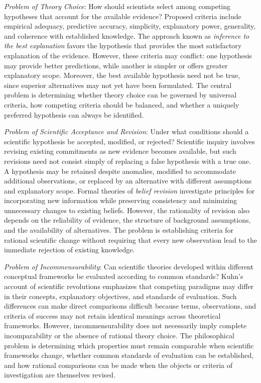 \emph{Problem of Theory Choice}: How should scientists select among competing hypotheses that account for the available evidence? Proposed criteria include empirical adequacy, predictive accuracy, simplicity, explanatory power, generality, and coherence with established knowledge. The approach known as \emph{inference to the best explanation} favors the hypothesis that provides the most satisfactory explanation of the evidence. However, these criteria may conflict: one hypothesis may provide better predictions, while another is simpler or offers greater explanatory scope. Moreover, the best available hypothesis need not be true, since superior alternatives may not yet have been formulated. The central problem is determining whether theory choice can be governed by universal criteria, how competing criteria should be balanced, and whether a uniquely preferred hypothesis can always be identified.

\emph{Problem of Scientific Acceptance and Revision}: Under what conditions should a scientific hypothesis be accepted, modified, or rejected? Scientific inquiry involves revising existing commitments as new evidence becomes available, but such revisions need not consist simply of replacing a false hypothesis with a true one. A hypothesis may be retained despite anomalies, modified to accommodate additional observations, or replaced by an alternative with different assumptions and explanatory scope. Formal theories of \emph{belief revision} investigate principles for incorporating new information while preserving consistency and minimizing unnecessary changes to existing beliefs. However, the rationality of revision also depends on the reliability of evidence, the structure of background assumptions, and the availability of alternatives. The problem is establishing criteria for rational scientific change without requiring that every new observation lead to the immediate rejection of existing knowledge.

\emph{Problem of Incommensurability}: Can scientific theories developed within different conceptual frameworks be evaluated according to common standards? Kuhn's account of scientific revolutions emphasizes that competing paradigms may differ in their concepts, explanatory objectives, and standards of evaluation. Such differences can make direct comparisons difficult because terms, observations, and criteria of success may not retain identical meanings across theoretical frameworks. However, incommensurability does not necessarily imply complete incomparability or the absence of rational theory choice. The philosophical problem is determining which properties must remain comparable when scientific frameworks change, whether common standards of evaluation can be established, and how rational comparisons can be made when the objects or criteria of investigation are themselves revised.

